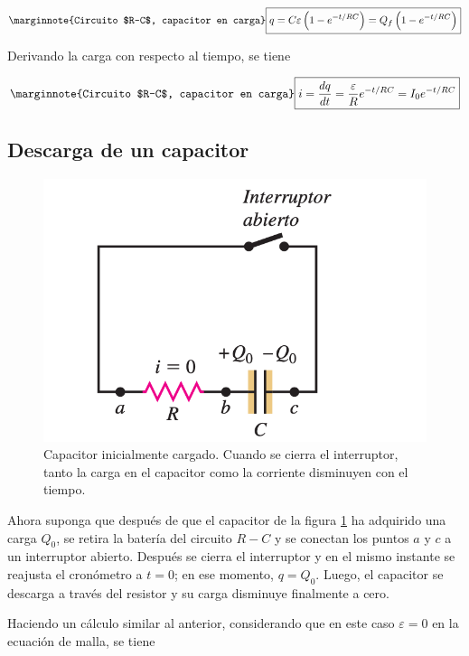 \begin{equation}\label{26.12}\marginnote{Circuito $R-C$, capacitor en carga}
\boxed{q=C\varepsilon \left(1-e^{-t/RC}\right)=Q_f\left(1-e^{-t/RC}\right)}
\end{equation}

Derivando la carga con respecto al tiempo, se tiene

\begin{equation}\label{26.13}\marginnote{Circuito $R-C$, capacitor en carga}
\boxed{i=\frac{dq}{dt}=\frac{\varepsilon}{R}e^{-t/RC}=I_0e^{-t/RC}}
\end{equation}

\subsection{Descarga de un capacitor}

\begin{figure}[h]
\centering
\includegraphics[scale=0.4]{fig/r-c-2}
\caption{Capacitor inicialmente cargado. Cuando se cierra el interruptor, tanto la carga en el capacitor como la corriente disminuyen con el tiempo.}
\label{fig:r-c-2}
\end{figure}

Ahora suponga que después de que el capacitor de la figura \ref{fig:r-c-2} ha adquirido una carga $Q_0$, se retira la batería del circuito $R-C$ y se conectan los puntos $a$ y $c$ a un interruptor abierto. Después se cierra el interruptor y en el mismo instante se reajusta el cronómetro a $t=0$; en ese momento, $q=Q_0$. Luego, el capacitor se descarga a través del resistor y su carga disminuye finalmente a cero. 

Haciendo un cálculo similar al anterior, considerando que en este caso $\varepsilon=0$ en la ecuación de malla, se tiene

